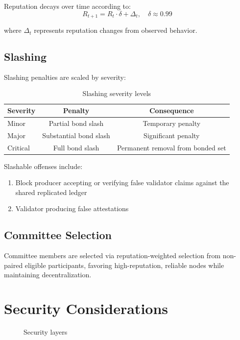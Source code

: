 \documentclass[11pt,a4paper]{article}
\begin{document}
Reputation decays over time according to:
\begin{equation}
R_{t+1} = R_t \cdot \delta + \Delta_t, \quad \delta \approx 0.99
\end{equation}

where $\Delta_t$ represents reputation changes from observed behavior.

\subsection{Slashing}
Slashing penalties are scaled by severity:

\begin{table}[H]
\centering
\begin{tabular}{lcc}
\toprule
\textbf{Severity} & \textbf{Penalty} & \textbf{Consequence} \\
\midrule
Minor & Partial bond slash & Temporary penalty \\
Major & Substantial bond slash & Significant penalty \\
Critical & Full bond slash & Permanent removal from bonded set \\
\bottomrule
\end{tabular}
\caption{Slashing severity levels}
\label{tab:slashing}
\end{table}

Slashable offenses include:
\begin{enumerate}
\item Block producer accepting or verifying false validator claims against the shared replicated ledger
\item Validator producing false attestations
\end{enumerate}

\subsection{Committee Selection}
Committee members are selected via reputation-weighted selection from non-paired eligible participants, favoring high-reputation, reliable nodes while maintaining decentralization.

\section{Security Considerations}
\begin{figure}[H]
\centering
{}
\caption{Security layers}
\label{fig:security}
\end{figure}
\end{document}
